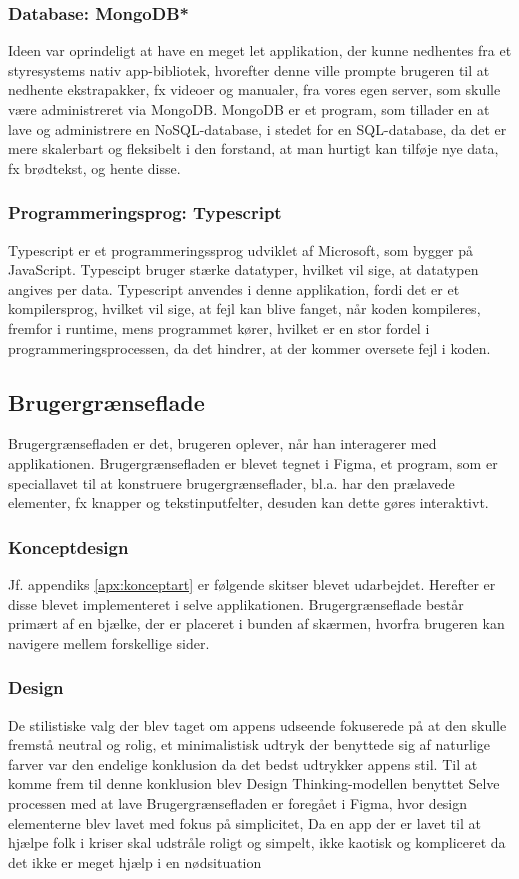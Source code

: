 \subsubsection{Database: MongoDB*}
Ideen var oprindeligt at have en meget let applikation, der kunne nedhentes fra et styresystems nativ app-bibliotek, hvorefter denne ville prompte brugeren til at nedhente ekstrapakker, fx videoer og manualer, fra vores egen server, som skulle være administreret via MongoDB. MongoDB er et program, som tillader en at lave og administrere en NoSQL-database, i stedet for en SQL-database, da det er mere skalerbart og fleksibelt i den forstand, at man hurtigt kan tilføje nye data, fx brødtekst, og hente disse. 
\subsubsection{Programmeringsprog: Typescript}
Typescript er et programmeringssprog udviklet af Microsoft, som bygger på JavaScript. Typescipt bruger stærke datatyper, hvilket vil sige, at datatypen angives per data. Typescript anvendes i denne applikation, fordi det er et kompilersprog, hvilket vil sige, at fejl kan blive fanget, når koden kompileres, fremfor i runtime, mens programmet kører, hvilket er en stor fordel i programmeringsprocessen, da det hindrer, at der kommer oversete fejl i koden.
\subsection{Brugergrænseflade}
Brugergrænsefladen er det, brugeren oplever, når han interagerer med applikationen. Brugergrænsefladen er blevet tegnet i Figma, et program, som er speciallavet til at konstruere brugergrænseflader, bl.a. har den prælavede elementer, fx knapper og tekstinputfelter, desuden kan dette gøres interaktivt. 
\subsubsection{Konceptdesign}
Jf. appendiks \ref{apx:konceptart} er følgende skitser blevet udarbejdet. Herefter er disse blevet implementeret i selve applikationen. Brugergrænseflade består primært af en bjælke, der er placeret i bunden af skærmen, hvorfra brugeren kan navigere mellem forskellige sider.
\subsubsection{Design}
De stilistiske valg der blev taget om appens udseende fokuserede på at den skulle fremstå neutral og rolig, et minimalistisk udtryk der benyttede sig af naturlige farver var den endelige konklusion da det bedst udtrykker appens stil. Til at komme frem til denne konklusion blev Design Thinking-modellen benyttet \cite{Design-grundbog} Selve processen med at lave Brugergrænsefladen er foregået i Figma, hvor design elementerne blev lavet med fokus på simplicitet, Da en app der er lavet til at hjælpe folk i kriser skal udstråle roligt og simpelt, ikke kaotisk og kompliceret da det ikke er meget hjælp i en nødsituation

